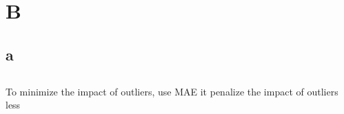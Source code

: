 \documentclass{article}
\begin{document}
\section*{B}
\subsection*{a}
\subsection*{}
To minimize the impact of outliers, use MAE it penalize the impact of outliers less
\subsection*{}






\section{}
\end{document}
